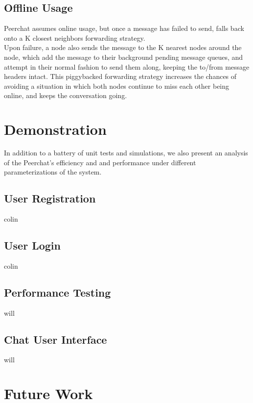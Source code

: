 \documentclass{article}
\begin{document}
\subsection{Offline Usage}

Peerchat assumes online usage, but once a message has failed to send, falls back onto a K closest neighbors forwarding strategy. \\

Upon failure, a node also sends the message to the K nearest nodes around the node, which add the message to their background pending message queues, and attempt in their normal fashion to send them along, keeping the to/from message headers intact. This piggybacked forwarding strategy increases the chances of avoiding a situation in which both nodes continue to miss each other being online, and keeps the conversation going. 

\section{Demonstration}

In addition to a battery of unit tests and simulations, we also present an analysis of the Peerchat's efficiency and and performance under different parameterizations of the system. 

\subsection{User Registration}

colin

\subsection{User Login}

colin 

\subsection{Performance Testing}

will

\subsection{Chat User Interface}

will

\section{Future Work}
\end{document}
